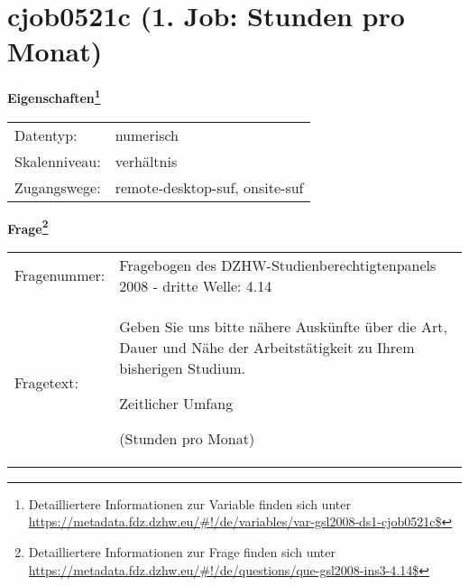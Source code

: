 
    \setcounter{footnote}{0}

    \vspace*{-1.8cm}
	\section{cjob0521c (1. Job: Stunden pro Monat)}
	\label{section:cjob0521c}



    \vspace*{0.5cm}
    \noindent\textbf{Eigenschaften\footnote{Detailliertere Informationen zur Variable finden sich unter
		\url{https://metadata.fdz.dzhw.eu/\#!/de/variables/var-gsl2008-ds1-cjob0521c$}}}\\
	\begin{tabularx}{\hsize}{@{}lX}
	Datentyp: & numerisch \\
	Skalenniveau: & verhältnis \\
	Zugangswege: &
	  remote-desktop-suf, 
	  onsite-suf
 \\
    \end{tabularx}



				\vspace*{0.5cm}
                \noindent\textbf{Frage\footnote{Detailliertere Informationen zur Frage finden sich unter
		              \url{https://metadata.fdz.dzhw.eu/\#!/de/questions/que-gsl2008-ins3-4.14$}}}\\
				\begin{tabularx}{\hsize}{@{}lX}
					Fragenummer: &
					  Fragebogen des DZHW-Studienberechtigtenpanels 2008 - dritte Welle:
					  4.14
 \\
					Fragetext: & Geben Sie uns bitte nähere Auskünfte über die Art, Dauer und Nähe der Arbeitstätigkeit zu Ihrem bisherigen Studium.\par  Zeitlicher Umfang\par  (Stunden pro Monat) \\
				\end{tabularx}






